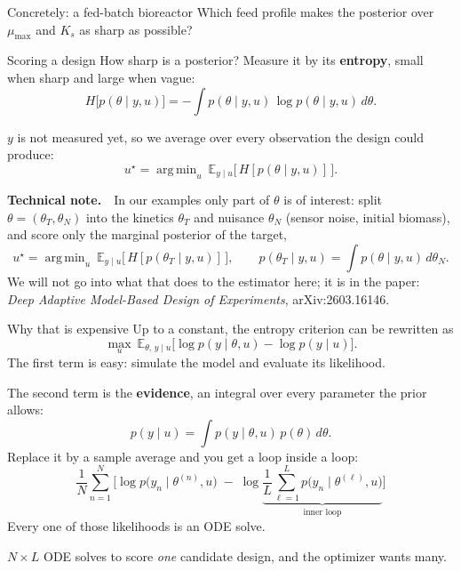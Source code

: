 \documentclass[aspectratio=169]{beamer}
\newcommand{\E}{\mathbb{E}}
\DeclareMathOperator*{\argmin}{arg\,min}
\begin{document}
\begin{frame}{Concretely: a fed-batch bioreactor}
  \vspace{0.4em}
  \alert{Which feed profile makes the posterior over $\mu_{\max}$ and $K_s$ as sharp as possible?}
\end{frame}

\begin{frame}{Scoring a design}
  \small
  \setlength{\abovedisplayskip}{2pt}\setlength{\belowdisplayskip}{2pt}%
  How sharp is a posterior? Measure it by its \textbf{entropy}, small when sharp and large when vague:
  \[
    H\big[p(\theta \mid y, u)\big] = -\int p(\theta \mid y, u)\,\log p(\theta \mid y, u)\, d\theta .
  \]

  $y$ is not measured yet, so we average over every observation the design could produce:
  \[
    u^\star = \argmin_u\ \E_{y \mid u}\big[\,H[p(\theta \mid y, u)]\,\big] .
  \]

  \vspace{0.5em}
  {\footnotesize \textbf{Technical note.}\ \ In our examples only part of $\theta$ is of interest:
  split $\theta = (\theta_T, \theta_N)$ into the kinetics $\theta_T$ and nuisance $\theta_N$
  (sensor noise, initial biomass), and score only the marginal posterior of the target,
  \[
    u^\star = \argmin_u\ \E_{y \mid u}\big[\,H[p(\theta_T \mid y, u)]\,\big],
    \qquad p(\theta_T \mid y, u) = \int p(\theta \mid y, u)\, d\theta_N .
  \]
  We will not go into what that does to the estimator here; it is in the paper:\\
  \emph{Deep Adaptive Model-Based Design of Experiments}, arXiv:2603.16146.}
\end{frame}

\begin{frame}{Why that is expensive}
  \small
  \setlength{\abovedisplayskip}{1pt}\setlength{\belowdisplayskip}{1pt}%
  Up to a constant, the entropy criterion can be rewritten as
  \[
    \max_u\ \E_{\theta,\, y \mid u}\big[\log p(y \mid \theta, u) - \log p(y \mid u)\big].
  \]
  The first term is easy: simulate the model and evaluate its likelihood.

  The second term is the \textbf{evidence}, an integral over every parameter the prior allows:
  \[
    p(y \mid u) = \int p(y \mid \theta, u)\,p(\theta)\,d\theta .
  \]
  Replace it by a sample average and you get a loop inside a loop:
  \[
    \frac{1}{N}\sum_{n=1}^{N}\Big[
      \log p\big(y_n \mid \theta^{(n)}, u\big)
      \;-\; \log \underbrace{\frac{1}{L}\sum_{\ell=1}^{L} p\big(y_n \mid \theta^{(\ell)}, u\big)}_{\text{inner loop}}
    \Big]
  \]
  Every one of those likelihoods is an ODE solve.

  \alert{$N \times L$ ODE solves to score \emph{one} candidate design, and the optimizer wants many.}

\end{frame}
\end{document}
